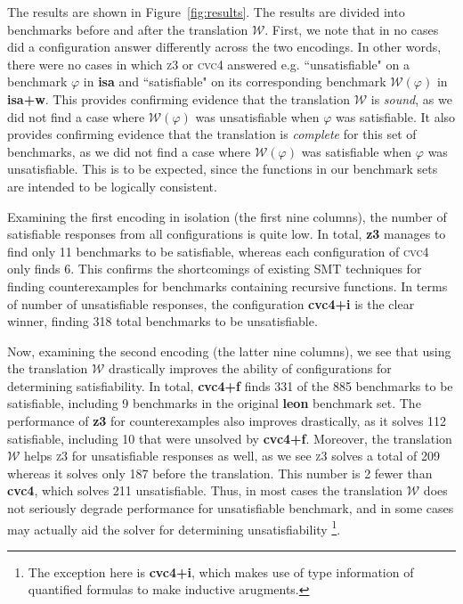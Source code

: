 \documentclass[runningheads,a4paper]{llncs}
\newcommand{\cvc}{\textsc{cvc}{\small 4}\xspace}
\newcommand{\ziii}{\textsc{z}{\small 3}\xspace}
\newcommand{\conv}{\mathcal{W}}
\begin{document}
The results are shown in Figure~\ref{fig:results}.
The results are divided into benchmarks before and after the translation $\conv$.
First, we note that in no cases did a configuration answer differently across the two encodings.
In other words, there were no cases in which \ziii or \cvc answered e.g. ``unsatisfiable" on a benchmark $\varphi$ in {\bf isa} 
and ``satisfiable" on its corresponding benchmark $\conv( \varphi )$ in {\bf isa+w}.
This provides confirming evidence that the translation $\conv$ is \emph{sound},
as we did not find a case where $\conv( \varphi )$ was unsatisfiable when $\varphi$ was satisfiable.
It also provides confirming evidence that the translation is \emph{complete} for this set of benchmarks,
as we did not find a case where $\conv( \varphi )$ was satisfiable when $\varphi$ was unsatisfiable.
This is to be expected, since the functions in our benchmark sets are intended to be logically consistent.

Examining the first encoding in isolation (the first nine columns),
the number of satisfiable responses from all configurations is quite low.
In total, {\bf z3} manages to find only 11 benchmarks to be satisfiable,
whereas each configuration of \cvc only finds 6.
This confirms the shortcomings of existing SMT techniques for finding counterexamples for benchmarks containing recursive functions.
In terms of number of unsatisfiable responses,
the configuration {\bf cvc4+i} is the clear winner, finding 318 total benchmarks to be unsatisfiable.

Now, examining the second encoding (the latter nine columns), 
we see that using the translation $\conv$ drastically improves the ability of configurations for determining satisfiability.
In total, {\bf cvc4+f} finds 331 of the 885 benchmarks to be satisfiable, including 9 benchmarks in the original {\bf leon} benchmark set.
The performance of {\bf z3} for counterexamples also improves drastically, as it solves 112 satisfiable,
including 10 that were unsolved by {\bf cvc4+f}.
Moreover, the translation $\conv$ helps \ziii for unsatisfiable responses as well,
as we see \ziii solves a total of 209 whereas it solves only 187 before the translation.
This number is 2 fewer than {\bf cvc4}, which solves 211 unsatisfiable.
Thus, in most cases the translation $\conv$ does not seriously degrade performance for unsatisfiable benchmark,
and in some cases may actually aid the solver for determining unsatisfiability
\footnote{The exception here is {\bf cvc4+i}, which makes use of type information of quantified formulas to make inductive arugments.}.
\end{document}
